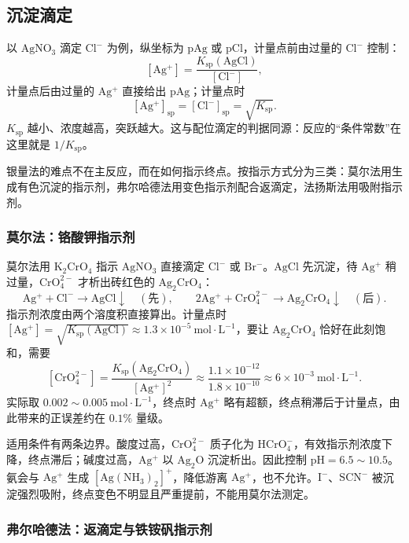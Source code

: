 \documentclass[UTF8]{ctexbook}
\begin{document}
\subsection{沉淀滴定}

以 $\mathrm{AgNO_3}$ 滴定 $\mathrm{Cl^-}$ 为例，纵坐标为 $\mathrm{pAg}$ 或 $\mathrm{pCl}$，计量点前由过量的 $\mathrm{Cl^-}$ 控制：
\[
[\mathrm{Ag^+}]=\frac{K_{\mathrm{sp}}(\mathrm{AgCl})}{[\mathrm{Cl^-}]},
\]
计量点后由过量的 $\mathrm{Ag^+}$ 直接给出 $\mathrm{pAg}$；计量点时
\[
[\mathrm{Ag^+}]_{\mathrm{sp}}=[\mathrm{Cl^-}]_{\mathrm{sp}}=\sqrt{K_{\mathrm{sp}}}.
\]
$K_{\mathrm{sp}}$ 越小、浓度越高，突跃越大。这与配位滴定的判据同源：反应的“条件常数”在这里就是 $1/K_{\mathrm{sp}}$。

银量法的难点不在主反应，而在如何指示终点。按指示方式分为三类：莫尔法用生成有色沉淀的指示剂，弗尔哈德法用变色指示剂配合返滴定，法扬斯法用吸附指示剂。

\subsubsection{莫尔法：铬酸钾指示剂}

莫尔法用 $\mathrm{K_2CrO_4}$ 指示 $\mathrm{AgNO_3}$ 直接滴定 $\mathrm{Cl^-}$ 或 $\mathrm{Br^-}$。$\mathrm{AgCl}$ 先沉淀，待 $\mathrm{Ag^+}$ 稍过量，$\mathrm{CrO_4^{2-}}$ 才析出砖红色的 $\mathrm{Ag_2CrO_4}$：
\[
\mathrm{Ag^+}+\mathrm{Cl^-}\longrightarrow\mathrm{AgCl}\downarrow\quad(\text{先}),
\qquad
2\mathrm{Ag^+}+\mathrm{CrO_4^{2-}}\longrightarrow\mathrm{Ag_2CrO_4}\downarrow\quad(\text{后}).
\]
指示剂浓度由两个溶度积直接算出。计量点时 $[\mathrm{Ag^+}]=\sqrt{K_{\mathrm{sp}}(\mathrm{AgCl})}\approx1.3\times10^{-5}\ \mathrm{mol\cdot L^{-1}}$，要让 $\mathrm{Ag_2CrO_4}$ 恰好在此刻饱和，需要
\[
[\mathrm{CrO_4^{2-}}]=\frac{K_{\mathrm{sp}}(\mathrm{Ag_2CrO_4})}{[\mathrm{Ag^+}]^2}
\approx\frac{1.1\times10^{-12}}{1.8\times10^{-10}}\approx6\times10^{-3}\ \mathrm{mol\cdot L^{-1}}.
\]
实际取 $0.002\sim0.005\ \mathrm{mol\cdot L^{-1}}$，终点时 $\mathrm{Ag^+}$ 略有超额，终点稍滞后于计量点，由此带来的正误差约在 $0.1\%$ 量级。

适用条件有两条边界。酸度过高，$\mathrm{CrO_4^{2-}}$ 质子化为 $\mathrm{HCrO_4^-}$，有效指示剂浓度下降，终点滞后；碱度过高，$\mathrm{Ag^+}$ 以 $\mathrm{Ag_2O}$ 沉淀析出。因此控制 $\mathrm{pH}=6.5\sim10.5$。氨会与 $\mathrm{Ag^+}$ 生成 $[\mathrm{Ag(NH_3)_2}]^+$，降低游离 $\mathrm{Ag^+}$，也不允许。$\mathrm{I^-}$、$\mathrm{SCN^-}$ 被沉淀强烈吸附，终点变色不明显且严重提前，不能用莫尔法测定。

\subsubsection{弗尔哈德法：返滴定与铁铵矾指示剂}
\end{document}
